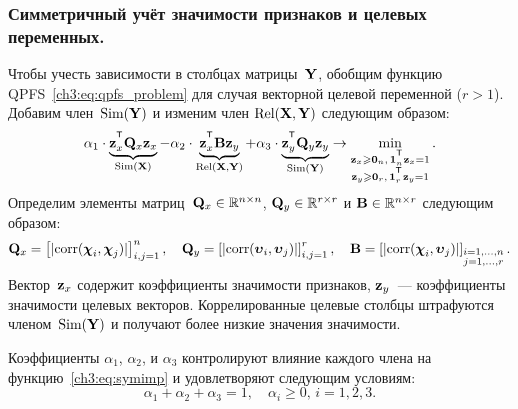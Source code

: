 \subsubsection{Симметричный учёт значимости признаков и целевых переменных.}
Чтобы учесть зависимости в столбцах матрицы~$\mathbf{Y}$, обобщим функцию QPFS~\eqref{ch3:eq:qpfs_problem} для случая векторной целевой переменной ($r > 1$).
Добавим член~$\text{Sim}(\mathbf{Y})$ и изменим член $\text{Rel}(\mathbf{X}, \mathbf{Y})$ следующим образом:
\begin{equation}
	\alpha_1 \cdot \underbrace{\bz_x^{\T} \bQ_x \bz_x}_{\text{Sim}(\bX)} - \alpha_2 \cdot \underbrace{\bz_x^{\T} \bB \bz_y}_{\text{Rel}(\bX, \bY)} + \alpha_3 \cdot \underbrace{\bz_y^{\T} \bQ_y \bz_y}_{\text{Sim}(\bY)} \rightarrow \min_{\substack{\bz_x \geq \bZero_n, \, \bOne_n^{\T}\bz_x=1 \\ \bz_y \geq \bZero_r, \, \bOne_r^{\T}\bz_y=1}}.
	\label{ch3:eq:symimp}
\end{equation}
Определим элементы матриц~$\mathbf{Q}_x \in \mathbb{R}^{n \times n}$, $\mathbf{Q}_y \in \mathbb{R}^{r \times r}$ и $\mathbf{B} \in \mathbb{R}^{n \times r}$ следующим образом:
\begin{equation*}
	\mathbf{Q}_x = \left[ |\text{corr}(\boldsymbol{\chi}_i, \boldsymbol{\chi}_j)| \right]_{i,j=1}^n, \quad
	\mathbf{Q}_y = \left[ |\text{corr}(\boldsymbol{\upsilon}_i, \boldsymbol{\upsilon}_j)| \right]_{i,j=1}^r, \quad
	\mathbf{B} =  \left[ |\text{corr}(\boldsymbol{\chi}_i, \boldsymbol{\upsilon}_j)| \right]_{\substack{i=1, \dots, n \\ j=1, \dots, r}}.
\end{equation*}
Вектор~$\mathbf{z}_x$ содержит коэффициенты значимости признаков, $\mathbf{z}_y$~--- коэффициенты значимости целевых векторов.
Коррелированные целевые столбцы штрафуются членом~$\text{Sim}(\mathbf{Y})$ и получают более низкие значения значимости.

Коэффициенты $\alpha_1$, $\alpha_2$, и $\alpha_3$ контролируют влияние каждого члена на функцию~\eqref{ch3:eq:symimp} и удовлетворяют следующим условиям:
\begin{equation*}
	\alpha_1 + \alpha_2 + \alpha_3 = 1, \quad \alpha_i \geq 0, \, i = 1, 2, 3.
\end{equation*}

